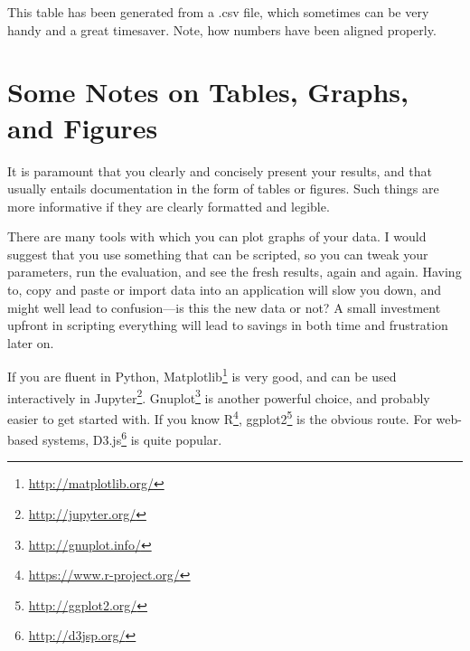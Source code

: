 \begin{table}
  \myfloatalign
  \caption[An auto-generated table]{This table has been generated from a
    .csv file, which sometimes can be very handy and a great timesaver. Note, how numbers have been aligned properly.}
  \label{tab:pretty-table}
\end{table}



\section{Some Notes on Tables, Graphs, and Figures}
\label{sec:some-notes-tables}

It is paramount that you clearly and concisely present your results, and
that usually entails documentation in the form of tables or figures.  Such
things are more informative if they are clearly formatted and legible.

There are many tools with which you can plot graphs of your data. I would
suggest that you use something that can be scripted, so you can tweak your
parameters, run the evaluation, and see the fresh results, again and
again. Having to, \eg copy and paste or import data into an application will
slow you down, and might well lead to confusion---is this the new data or
not? A small investment upfront in scripting everything will lead to
savings in both time and frustration later on.

If you are fluent in Python,
Matplotlib\footnote{\url{http://matplotlib.org/}} is very good, and can be
used interactively in
Jupyter\footnote{\url{http://jupyter.org/}}. Gnuplot\footnote{\url{http://gnuplot.info/}}
is another powerful choice, and probably easier to get started with. If you
know R\footnote{\url{https://www.r-project.org/}},
ggplot2\footnote{\url{http://ggplot2.org/}} is the obvious route.  For
web-based systems, D3.js\footnote{\url{http://d3jsp.org/}} is quite popular.

